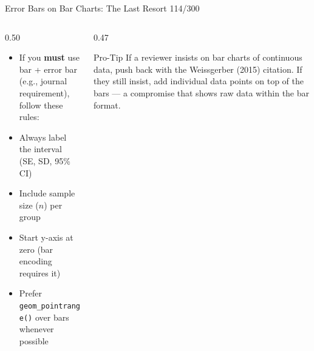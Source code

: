 \documentclass[10pt]{beamer}
\newcommand{\smark}[1]{\hfill{\scriptsize\color{codegray}#1}}
\begin{document}
\begin{frame}{Error Bars on Bar Charts: The Last Resort}
\smark{114/300}
\begin{columns}[T]
\begin{column}{0.50\textwidth}
\begin{itemize}
    \item If you \textbf{must} use bar + error bar (e.g., journal requirement), follow these rules:
    \item Always label the interval (SE, SD, 95\% CI)
    \item Include sample size ($n$) per group
    \item Start y-axis at zero (bar encoding requires it)
    \item Prefer \texttt{geom\_pointrange()} over bars whenever possible
\end{itemize}
\end{column}
\begin{column}{0.47\textwidth}
\begin{alertblock}{Pro-Tip}
    \scriptsize If a reviewer insists on bar charts of continuous data, push back with the Weissgerber (2015) citation. If they still insist, add individual data points on top of the bars --- a compromise that shows raw data within the bar format.
\end{alertblock}
\end{column}
\end{columns}
\end{frame}
\end{document}
